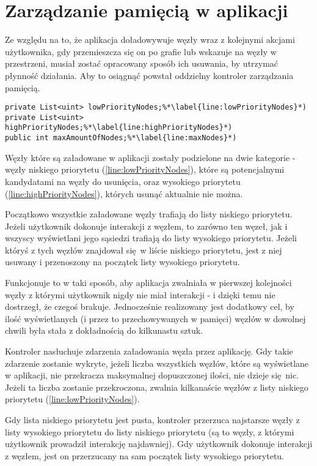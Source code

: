 \section{Zarządzanie pamięcią w aplikacji}
\label{sec:pamiec}
Ze względu na to, że aplikacja doładowywuje węzły wraz z kolejnymi akcjami użytkownika, gdy przemieszcza się on po grafie lub wskazuje na węzły w przestrzeni, musiał zostać opracowany sposób ich usuwania, by utrzymać płynność działania. Aby to osiągnąć powstał oddzielny kontroler zarządzania pamięcią.

\begin{lstlisting}[caption={Pomocnicze struktury i zmienne kontrolera zarządzania pamięcią}, label=lst:nodePriority]
private List<uint> lowPriorityNodes;%*\label{line:lowPriorityNodes}*)
private List<uint> highPriorityNodes;%*\label{line:highPriorityNodes}*)
public int maxAmountOfNodes;%*\label{line:maxNodes}*)
\end{lstlisting}

Węzły które są załadowane w aplikacji zostały podzielone na dwie kategorie - węzły niskiego priorytetu (\ref{line:lowPriorityNodes}), które są potencjalnymi kandydatami na węzły do usunięcia, oraz wysokiego priorytetu (\ref{line:highPriorityNodes}), których usunąć aktualnie nie można.

Początkowo wszystkie załadowane węzły trafiają do listy niskiego priorytetu. Jeżeli użytkownik dokonuje interakcji z węzłem, to zarówno ten węzeł, jak i wszyscy wyświetlani jego sąsiedzi trafiają do listy wysokiego priorytetu. Jeżeli któryś z tych węzłów znajdował się w liście niskiego priorytetu, jest z niej usuwany i przenoszony na początek listy wysokiego priorytetu.

Funkcjonuje to w taki sposób, aby aplikacja zwalniała w pierwszej kolejności węzły z którymi użytkownik nigdy nie miał interakcji - i dzięki temu nie dostrzegł, że czegoś brakuje. Jednocześnie realizowany jest dodatkowy cel, by ilość wyświetlanych (i przez to przechowywanych w pamięci) węzłów w dowolnej chwili była stała z dokładnością do kilkunastu sztuk.

Kontroler nasłuchuje zdarzenia załadowania węzła przez aplikację. Gdy takie zdarzenie zostanie wykryte, jeżeli liczba wszystkich węzłów, które są wyświetlane w aplikacji, nie przekracza maksymalnej dopuszczonej ilości, nie dzieje się nic. Jeżeli ta liczba zostanie przekroczona, zwalnia kilkanaście węzłów z listy niskiego priorytetu (\ref{line:lowPriorityNodes}).

Gdy lista niskiego priorytetu jest pusta, kontroler przerzuca najstarsze węzły z listy wysokiego priorytetu do listy niskiego priorytetu (są to węzły, z którymi użytkownik prowadził interakcję najdawniej). Gdy użytkownik dokonuje interakcji z węzłem, jest on przerzucany na sam początek listy wysokiego priorytetu.